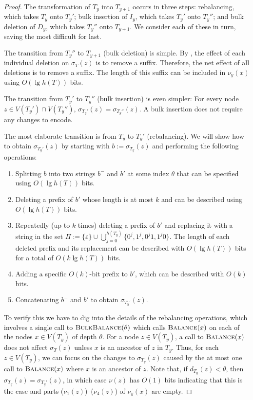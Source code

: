 \documentclass[kpfonts]{patmorin}
\begin{document}
\begin{proof}
  The transformation of $T_{y}$ into $T_{y+1}$ occurs in three steps: rebalancing, which takes $T_y$ onto $T_y'$; bulk insertion of $I_y$, which takes $T_y'$ onto $T_y''$; and bulk deletion of $D_y$, which takes $T_y''$ onto $T_{y+1}$.  We consider each of these in turn, saving the most difficult for last.
  
  The transition from $T_y''$ to $T_{y+1}$ (bulk deletion) is simple.  By , the effect of each individual deletion on $\sigma_T(z)$ is to remove a suffix.  Therefore, the net effect of all deletions is to remove a suffix.  The length of this suffix can be included in $\nu_y(x)$ using $O(\lg h(T))$ bits.
  
  The transition from $T_y'$ to $T_y''$ (bulk insertion) is even simpler: For every node $z\in V(T_y')\cap V(T_y'')$, $\sigma_{T_y'}(z)=\sigma_{T_y''}(z)$.  A bulk insertion does not require any changes to encode.
  
  The most elaborate transition is from $T_y$ to $T_y'$ (rebalancing).  We will show how to obtain $\sigma_{T_y'}(z)$ by starting with $b:=\sigma_{T_y}(z)$ and performing the following operations:
  \begin{enumerate}[($\nu_1$)]
    \item Splitting $b$ into two strings $b^-$ and $b'$ at some index $\theta$ that can be specified using $O(\lg h(T))$ bits.
    \item Deleting a prefix of $b'$ whose length is at most $k$ and can be described using $O(\lg h(T))$ bits.
    \item Repeatedly (up to $k$ times) deleting a prefix of $b'$ and replacing it with a string in the set $\Pi:=\{\varepsilon\}\cup\bigcup_{j=0}^{h(T_y)}\{0^j, 1^j, 0^j1, 1^j0\}$. The length of each deleted prefix and its replacement can be described with $O(\lg h(T))$ bits for a total of $O(k\lg h(T))$ bits.
    \item Adding a specific $O(k)$-bit prefix to $b'$, which can be described with $O(k)$ bits.
    \item Concatenating $b^-$ and $b'$ to obtain $\sigma_{T_y'}(z)$.
  \end{enumerate}
  To verify this we have to dig into the details of the rebalancing operations, which involves a single call to $\textsc{BulkBalance}(\theta)$ which calls $\textsc{Balance}(x)$ on each of the nodes $x\in V(T_y)$ of depth $\theta$.    
  For a node $z\in V(T_y)$, a call to $\textsc{Balance}(x)$ does not affect $\sigma_T(z)$ unless $x$ is an ancestor of $z$ in $T_y$.  Thus, for each $z\in V(T_y)$, we can focus on the changes to $\sigma_{T_y}(z)$ caused by the at most one call to $\textsc{Balance}(x)$ where $x$ is an ancestor of $z$. Note that, if $d_{T_y}(z)<\theta$, then $\sigma_{T_y}(z)=\sigma_{T_y'}(z)$, in which case $\nu(z)$ has $O(1)$ bits indicating that this is the case and parts ($\nu_1(z)$)--($\nu_4(z)$) of $\nu_y(x)$ are empty.
  

\end{proof}
\end{document}
